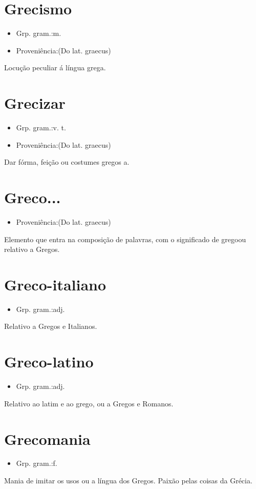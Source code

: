 \section{Grecismo}
\begin{itemize}
\item {Grp. gram.:m.}
\end{itemize}
\begin{itemize}
\item {Proveniência:(Do lat. \textunderscore graecus\textunderscore )}
\end{itemize}
Locução peculiar á língua grega.
\section{Grecizar}
\begin{itemize}
\item {Grp. gram.:v. t.}
\end{itemize}
\begin{itemize}
\item {Proveniência:(Do lat. \textunderscore graecus\textunderscore )}
\end{itemize}
Dar fórma, feição ou costumes gregos a.
\section{Greco...}
\begin{itemize}
\item {Proveniência:(Do lat. \textunderscore graecus\textunderscore )}
\end{itemize}
Elemento que entra na composição de palavras, com o significado de \textunderscore grego\textunderscore  ou \textunderscore relativo a Gregos\textunderscore .
\section{Greco-italiano}
\begin{itemize}
\item {Grp. gram.:adj.}
\end{itemize}
Relativo a Gregos e Italianos.
\section{Greco-latino}
\begin{itemize}
\item {Grp. gram.:adj.}
\end{itemize}
Relativo ao latim e ao grego, ou a Gregos e Romanos.
\section{Grecomania}
\begin{itemize}
\item {Grp. gram.:f.}
\end{itemize}
Mania de imitar os usos ou a língua dos Gregos.
Paixão pelas coisas da Grécia.
